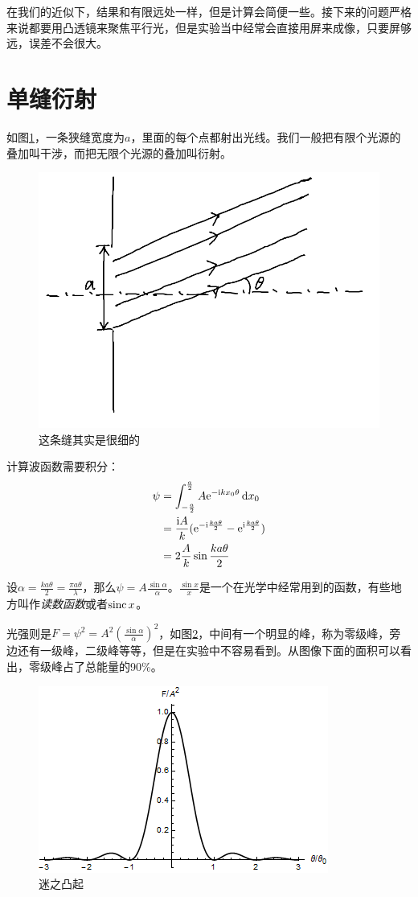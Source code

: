 在我们的近似下，结果和有限远处一样，但是计算会简便一些。接下来的问题严格来说都要用凸透镜来聚焦平行光，但是实验当中经常会直接用屏来成像，只要屏够远，误差不会很大。
\section{单缝衍射}
如图\ref{fig-silt-diff}，一条狭缝宽度为$a$，里面的每个点都射出光线。我们一般把有限个光源的叠加叫干涉，而把无限个光源的叠加叫衍射。
\begin{figure}[htb]
\centering
\includegraphics[width=0.33\linewidth]{fig/silt-diff.png}
\caption{这条缝其实是很细的}
\label{fig-silt-diff}
\end{figure}

计算波函数需要积分：
\begin{align*}
\psi&=\int_{-\frac{a}{2}}^{\frac{a}{2}} A \mathrm{e}^{-\mathrm{i} k x_0 \theta} \mathop{}\!\mathrm{d} x_0 \\
&=\frac{\mathrm{i} A}{k} (\mathrm{e}^{-\mathrm{i} \frac{k a \theta}{2}}-\mathrm{e}^{\mathrm{i} \frac{k a \theta}{2}}) \\
&=2 \frac{A}{k} \sin \frac{k a \theta}{2}
\end{align*}

设$\alpha=\frac{k a \theta}{2}=\frac{\pi a \theta}{\lambda}$，那么$\psi=A \frac{\sin \alpha}{\alpha}$。$\frac{\sin x}{x}$是一个在光学中经常用到的函数，有些地方叫作\emph{读数函数}或者$\mathrm{sinc}\mathop{}\! x$。

光强则是$F=\psi^2=A^2 (\frac{\sin \alpha}{\alpha})^2$，如图\ref{fig-silt-diff-plot}，中间有一个明显的峰，称为零级峰，旁边还有一级峰，二级峰等等，但是在实验中不容易看到。从图像下面的面积可以看出，零级峰占了总能量的90\%。
\begin{figure}[htb]
\centering
\includegraphics[width=0.33\linewidth]{fig/silt-diff-plot.png}
\caption{迷之凸起}
\label{fig-silt-diff-plot}
\end{figure}

